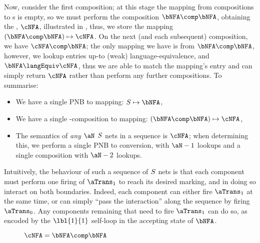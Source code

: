 Now, consider the first composition; at this stage the mapping from
compositions to \TNFA{}s is empty, so we must perform the composition $\bNFA
\comp \bNFA$, obtaining the \TNFA{}, $\cNFA$, illustrated in
, thus, we store the mapping $\left(\bNFA \comp
\bNFA\right) \mapsto \cNFA$. On the next (and each subsequent) composition, we
have $\cNFA \comp \bNFA$; the only mapping we have is from $\bNFA \comp \bNFA$,
however, we lookup entries up-to (weak) language-equivalence, and $\bNFA
\langEquiv \cNFA$, thus we are able to match the mapping's entry and can simply
return $\cNFA$ rather than perform any further compositions. To summarise:
\begin{itemize}
    \item We have a single PNB to \TNFA{} mapping: $\stewie \mapsto \bNFA$,
    \item We have a single \TNFA{}-composition to \TNFA{} mapping:
        $\left(\bNFA \comp \bNFA\right) \mapsto \cNFA$,
    \item The \TNFA{} semantics of \emph{any} $\aN$ $S{}$ nets in a
        sequence is $\cNFA$; when determining this, we perform a single PNB to
        \TNFA{} conversion, with $\aN - 1$ lookups and a single \TNFA{}
        composition with $\aN - 2$ lookups.
\end{itemize}
Intuitively, the behaviour of such a sequence of $S$ nets is that each
component must perform one firing of $\aTrans_1$ to reach its desired marking,
and in doing so interact on both boundaries. Indeed, each component can either
fire $\aTrans_1$ at the same time, or can simply ``pass the interaction'' along
the sequence by firing $\aTrans_0$. Any components remaining that need to fire
$\aTrans_1$ can do so, as encoded by the $\lbl{1}{1}$ self-loop in the
accepting state of $\bNFA$.

\begin{figure}[ht]
    \centering
    \caption{\TNFA{} $\cNFA = \bNFA \comp \bNFA$}
    \label{fig:memoTNFAComposition}
\end{figure}

